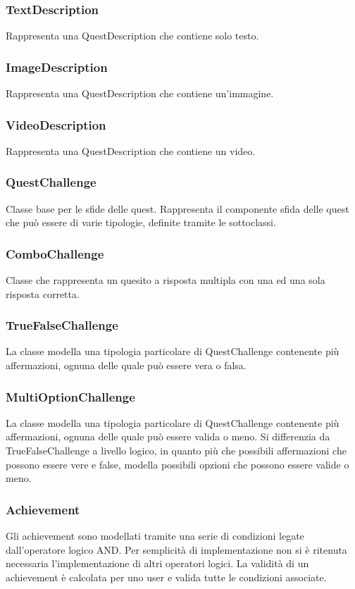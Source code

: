 \subsubsection{TextDescription} Rappresenta una QuestDescription che contiene solo testo.
\subsubsection{ImageDescription} Rappresenta una QuestDescription che contiene un'immagine.
\subsubsection{VideoDescription} Rappresenta una QuestDescription che contiene un video.
\subsubsection{QuestChallenge} Classe base per le sfide delle quest. Rappresenta il componente sfida delle quest che può essere di varie tipologie, definite tramite le sottoclassi.
\subsubsection{ComboChallenge} Classe che rappresenta un quesito a risposta multipla con una ed una sola risposta corretta.
\subsubsection{TrueFalseChallenge} La classe modella una tipologia particolare di QuestChallenge contenente più affermazioni, ognuna delle quale può essere vera o falsa.
\subsubsection{MultiOptionChallenge} La classe modella una tipologia particolare di QuestChallenge contenente più affermazioni, ognuna delle quale può essere valida o meno. Si differenzia da TrueFalseChallenge a livello logico, in quanto più che possibili affermazioni che possono essere vere e false, modella possibili opzioni che possono essere valide o meno.
\subsubsection{Achievement} Gli achievement sono modellati tramite una serie di condizioni legate dall'operatore logico AND. Per semplicità di implementazione non si è ritenuta necessaria l'implementazione di altri operatori logici. La validità di un achievement è calcolata per uno user e valida tutte le condizioni associate.
